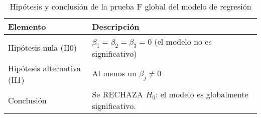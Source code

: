 \begin{table}[H]
    \centering
    \color{blue}
    \caption{Hipótesis y conclusión de la prueba F global del modelo de regresión}
    \label{tab:hipotesis_conclusion}
    \begin{tabular}{ll}
        \toprule
        Elemento & Descripción \\
        \midrule
        Hipótesis nula (H0) & $\beta_1 = \beta_2 = \beta_3 = 0$ (el modelo no es significativo) \\
        Hipótesis alternativa (H1) & Al menos un $\beta_j \neq 0$ \\
        Conclusión & Se RECHAZA $H_0$: el modelo es globalmente significativo. \\
        \bottomrule
    \end{tabular}
\end{table}
